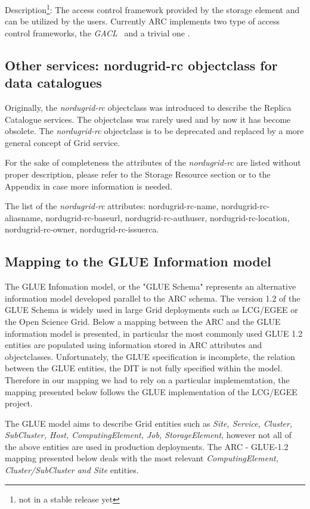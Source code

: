 \documentclass{article}
\begin{document}
Description\footnote{not in a stable release yet}: The access control framework provided by the storage
element and can be utilized by the users. Currently ARC implements two
type of access control frameworks, the {\it GACL}~\cite{gacl} and a
trivial one \cite{grid-manager}.


\subsection{Other services: nordugrid-rc objectclass for data catalogues}

Originally, the {\it nordugrid-rc} objectclass was introduced to
describe the Replica Catalogue services. The objectclass was rarely
used and by now it has become obsolete. The {\it nordugrid-rc}
objectclass is to be deprecated and replaced by a more general concept
of Grid service.

For the sake of completeness the attributes of the {\it nordugrid-rc}
are listed without proper description, please refer to the Storage
Resource section or to the Appendix in case more information is
needed.

The list of the {\it nordugrid-rc} attributes: nordugrid-rc-name,
nordugrid-rc-aliasname, nordugrid-rc-baseurl, nordugrid-rc-authuser,
nordugrid-rc-location, nordugrid-rc-owner, nordugrid-rc-issuerca.


\subsection{Mapping to the GLUE Information model}

The GLUE Infomation model, or the "GLUE Schema" represents an
alternative information model\cite{glue1.2} developed
parallel to the ARC schema. The version 1.2 of
the GLUE Schema is widely used in large Grid deployments such as LCG/EGEE or 
the Open Science Grid. Below a mapping between the ARC and the
GLUE information model is presented, in particular the most 
commonly used GLUE 1.2 entities are populated using information stored 
in ARC attributes and objectclasses. Unfortunately,
the GLUE specification\cite{glue1.2} is incomplete, the relation 
between the GLUE entities, the DIT is not fully specified within 
the model. Therefore in our mapping we had to rely on a particular
implememtation, the mapping presented below follows the GLUE
implementation of the LCG/EGEE project.
 
The GLUE model aims to describe Grid entities such as {\it Site,
Service, Cluster, SubCluster, Host, ComputingElement, Job, StorageElement},
however not all of the above entities are used in production deployments.
The ARC - GLUE-1.2 mapping presented below deals with the most
relevant {\it ComputingElement, Cluster/SubCluster and Site} entities.
\end{document}
